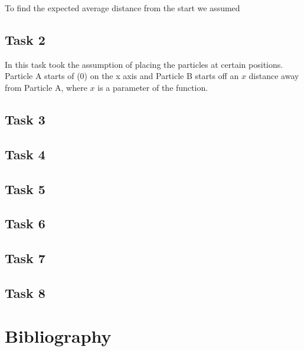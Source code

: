 \documentclass{article}
\begin{document}
To find the expected average distance from the start we assumed 

\subsection{Task 2}
In this task took the assumption of placing the particles at certain positions. Particle 
A starts of (0) on the x axis and Particle B starts off an $x$ distance away from Particle A, where $x$ is 
a parameter of the function.

\subsection{Task 3}
\subsection{Task 4}
\subsection{Task 5}
\subsection{Task 6}
\subsection{Task 7}
\subsection{Task 8}
\section{Bibliography}
\end{document}
